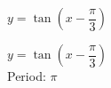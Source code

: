 {$y = \tan \left(x - \dfrac{\pi}{3} \right)$}
{$y = \tan \left(x - \dfrac{\pi}{3} \right)$\\
Period: $\pi$

\begin{center}
\end{center}
}